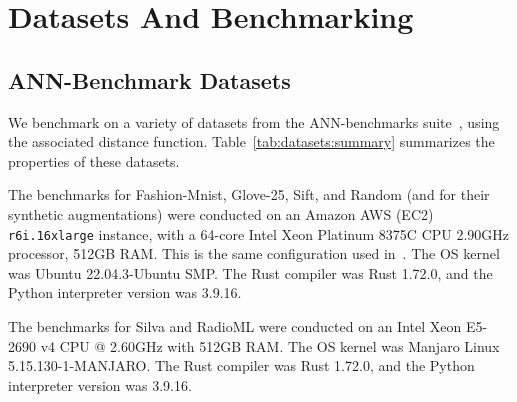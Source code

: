 \section{Datasets And Benchmarking}
\label{sec:datasets-and-benchmarks}

\subsection{ANN-Benchmark Datasets}
\label{sec:datasets-and-benchmarks:ann-benchmark-datasets}

We benchmark on a variety of datasets from the ANN-benchmarks suite~\cite{Aumller2018ANNBenchmarksAB}, using the associated distance function.
Table~\ref{tab:datasets:summary} summarizes the properties of these datasets.

The benchmarks for Fashion-Mnist, Glove-25, Sift, and Random (and for their synthetic augmentations) were conducted on an Amazon AWS (EC2) \texttt{r6i.16xlarge} instance, with a 64-core Intel Xeon Platinum 8375C CPU 2.90GHz processor, 512GB RAM.
This is the same configuration used in~\cite{Aumller2018ANNBenchmarksAB}.
The OS kernel was Ubuntu 22.04.3-Ubuntu SMP.
The Rust compiler was Rust 1.72.0, and the Python interpreter version was 3.9.16.

The benchmarks for Silva and RadioML were conducted on an Intel Xeon E5-2690 v4 CPU @ 2.60GHz with 512GB RAM.
The OS kernel was Manjaro Linux 5.15.130-1-MANJARO.
The Rust compiler was Rust 1.72.0, and the Python interpreter version was 3.9.16.

